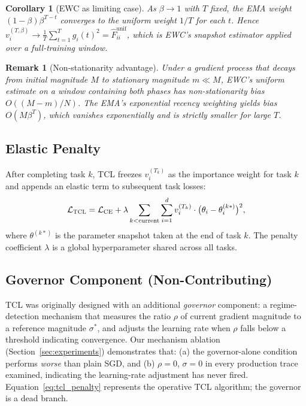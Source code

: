 \documentclass[10pt,letterpaper]{article}
\newtheorem{corollary}[theorem]{Corollary}
\newtheorem{remark}{Remark}
\newcommand{\TCL}{\textsc{TCL}}
\newcommand{\SGD}{\textsc{SGD}}
\begin{document}
\begin{corollary}[EWC as limiting case]
\label{cor:ewc_limit}
As $\beta \to 1$ with $T$ fixed, the EMA weight $(1-\beta)\beta^{T-t}$
converges to the uniform weight $1/T$ for each $t$.
Hence $v_i^{(T,\beta)} \to \frac{1}{T}\sum_{t=1}^T g_i(t)^2 = \hat{F}_{ii}^{\mathrm{unif}}$,
which is EWC's snapshot estimator applied over a full-training window.
\end{corollary}

\begin{remark}[Non-stationarity advantage]
\label{rem:nonstationarity}
Under a gradient process that decays from initial magnitude $M$ to stationary
magnitude $m \ll M$, EWC's uniform estimate on a window containing both phases
has non-stationarity bias $O((M-m)/N)$.
The EMA's exponential recency weighting yields bias $O(M\beta^T)$, which vanishes
exponentially and is strictly smaller for large $T$.
\end{remark}

\subsection{Elastic Penalty}
\label{sec:penalty}

After completing task $k$, \TCL{} freezes $v_i^{(T_k)}$ as the importance weight
for task $k$ and appends an elastic term to subsequent task losses:
\begin{equation}
  \mathcal{L}_{\TCL} = \mathcal{L}_{\mathrm{CE}}
    + \lambda \sum_{k<\text{current}} \sum_{i=1}^{d}
      v_i^{(T_k)} \cdot \bigl(\theta_i - \theta_i^{(k*)}\bigr)^2,
  \label{eq:tcl_penalty}
\end{equation}
where $\theta^{(k*)}$ is the parameter snapshot taken at the end of task $k$.
The penalty coefficient $\lambda$ is a global hyperparameter shared across all tasks.

\subsection{Governor Component (Non-Contributing)}
\label{sec:governor}

\TCL{} was originally designed with an additional \emph{governor} component:
a regime-detection mechanism that measures the ratio $\rho$ of current gradient
magnitude to a reference magnitude $\sigma^*$, and adjusts the learning rate
when $\rho$ falls below a threshold indicating convergence.
Our mechanism ablation (Section~\ref{sec:experiments}) demonstrates that:
(a) the governor-alone condition performs \emph{worse} than plain \SGD{}, and
(b) $\rho = 0$, $\sigma = 0$ in every production trace examined, indicating
the learning-rate adjustment has never fired.
Equation~\eqref{eq:tcl_penalty} represents the operative \TCL{} algorithm;
the governor is a dead branch.
\end{document}
